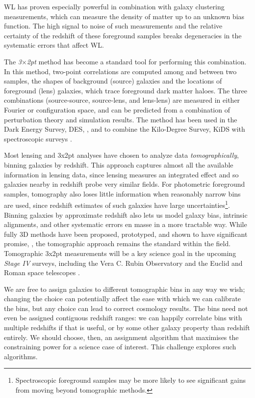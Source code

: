 \documentclass[twocolumn,twocolappendix]{aastex63}
\begin{document}
WL has proven especially powerful in combination with galaxy clustering measurements,
which can measure the density of matter up to an unknown bias function.  The high signal
to noise of such measurements and the relative certainty of the redshift of these foreground
samples breaks degeneracies in the systematic errors that affect WL.

The \emph{3$\times$2pt} method has become a standard tool for performing this combination.
In this method, two-point correlations are computed among and between two samples, the shapes of 
background (source) galaxies and the locations of foreground (lens) galaxies, which trace foreground
dark matter haloes.  The three combinations (source-source, source-lens, and lens-lens) are
measured in either Fourier or configuration space, and can be predicted from a combination of 
perturbation theory and simulation results.  The method has been used in the Dark Energy Survey, DES, 
\citep{des-3x2pt}, and to combine the Kilo-Degree 
Survey, KiDS with spectroscopic surveys \citep{kids-3x2pt, kids_gama, kids_2df}.

Most lensing and 3x2pt analyses have chosen to analyze data \emph{tomographically}, 
binning galaxies by redshift.
This approach captures almost all the available information in lensing data, since lensing measures
an integrated effect and so galaxies nearby in redshift probe very similar fields.  For photometric
foreground samples, tomography also loses little information when reasonably narrow bins are used,
since redshift estimates of such galaxies have
large uncertainties\footnote{Spectroscopic foreground samples may be more likely to see significant 
gains from moving beyond tomographic methods.}.  Binning galaxies by approximate redshift also lets us 
model galaxy bias, intrinsic alignments, and other systematic errors en masse in a more tractable way.
While fully 3D methods have been proposed, prototyped, and shown to have significant promise, 
\citep{heavens,kitching}, the tomographic approach remains the standard within the field.
Tomographic 3x2pt measurements will be a key science goal in the upcoming \emph{Stage IV} surveys,
including the Vera C. Rubin Observatory \citep{rubin} and the Euclid and Roman space telescopes
\citep{euclid,roman}.

We are free to assign galaxies to different tomographic bins in any way we wish; changing the choice
can potentially affect the ease with which we can calibrate
the bins, but any choice can lead to correct cosmology results. The bins need not even be assigned contiguous redshift ranges: we can happily correlate bins with multiple redshifts if that is useful, or by some other galaxy property than redshift entirely.
We should choose, then, an assignment algorithm that maximises the constraining power for a science
case of interest.  This challenge explores such algorithms.
\end{document}
